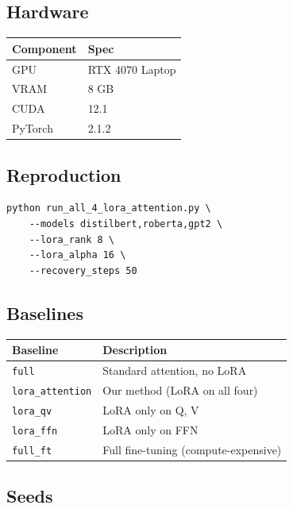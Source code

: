 \subsection{Hardware}

\begin{table}[H]
\centering
\small
\begin{tabular}{ll}
\toprule
\textbf{Component} & \textbf{Spec} \\
\midrule
GPU & RTX 4070 Laptop \\
VRAM & 8 GB \\
CUDA & 12.1 \\
PyTorch & 2.1.2 \\
\bottomrule
\end{tabular}
\end{table}

\subsection{Reproduction}

\begin{lstlisting}
python run_all_4_lora_attention.py \
    --models distilbert,roberta,gpt2 \
    --lora_rank 8 \
    --lora_alpha 16 \
    --recovery_steps 50
\end{lstlisting}

\subsection{Baselines}

\begin{table}[H]
\centering
\small
\begin{tabular}{ll}
\toprule
\textbf{Baseline} & \textbf{Description} \\
\midrule
\texttt{full} & Standard attention, no LoRA \\
\texttt{lora\_attention} & Our method (LoRA on all four) \\
\texttt{lora\_qv} & LoRA only on Q, V \\
\texttt{lora\_ffn} & LoRA only on FFN \\
\texttt{full\_ft} & Full fine-tuning (compute-expensive) \\
\bottomrule
\end{tabular}
\end{table}

\subsection{Seeds}


